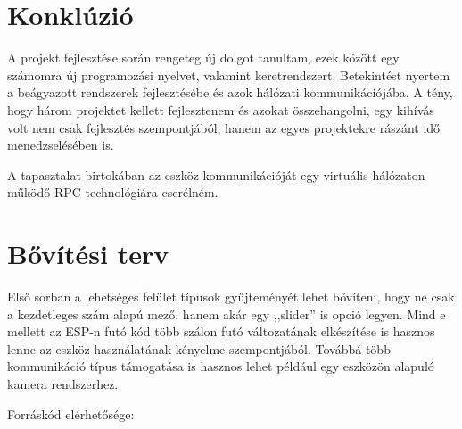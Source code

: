 \documentclass{thesis-ekf}
\theoremstyle{definition}
\theoremstyle{remark}
\begin{document}
	\section*{Konklúzió}
	A projekt fejlesztése során rengeteg új dolgot tanultam, ezek között egy számomra új programozási nyelvet, valamint keretrendszert. Betekintést nyertem a beágyazott rendszerek fejlesztésébe és azok hálózati kommunikációjába. A tény, hogy három projektet kellett fejlesztenem és azokat összehangolni, egy kihívás volt nem csak fejlesztés szempontjából, hanem az egyes projektekre rászánt idő menedzselésében is.
	
	A tapasztalat birtokában az eszköz kommunikációját egy virtuális hálózaton működő RPC technológiára cserélném.
	\section*{Bővítési terv}
	
	Első sorban a lehetséges felület típusok gyűjteményét lehet bővíteni, hogy ne csak a kezdetleges szám alapú mező, hanem akár egy ,,slider'' is opció legyen. Mind e mellett az ESP-n futó kód több szálon futó változatának elkészítése is hasznos lenne az eszköz használatának kényelme szempontjából. Továbbá több kommunikáció típus támogatása is hasznos lehet például egy eszközön alapuló kamera rendszerhez.
	\begin{center}
		Forráskód elérhetősége:\\
		{}
	\end{center}
	
\end{document}
